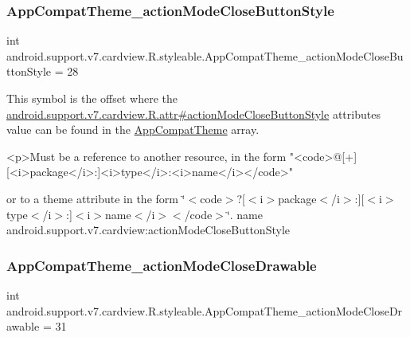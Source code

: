\subsubsection{\texorpdfstring{App\+Compat\+Theme\+\_\+action\+Mode\+Close\+Button\+Style}{AppCompatTheme\_actionModeCloseButtonStyle}}
{\footnotesize\ttfamily int android.\+support.\+v7.\+cardview.\+R.\+styleable.\+App\+Compat\+Theme\+\_\+action\+Mode\+Close\+Button\+Style = 28\hspace{0.3cm}{\ttfamily [static]}}

This symbol is the offset where the \hyperlink{classandroid_1_1support_1_1v7_1_1cardview_1_1R_1_1attr_ab744fe0cdbca0b2272aae43d708223b3}{android.\+support.\+v7.\+cardview.\+R.\+attr\#action\+Mode\+Close\+Button\+Style} attribute\textquotesingle{}s value can be found in the \hyperlink{classandroid_1_1support_1_1v7_1_1cardview_1_1R_1_1styleable_a52e6f69f954ecc2622d72c0b4d298938}{App\+Compat\+Theme} array.

\begin{DoxyVerb}      <p>Must be a reference to another resource, in the form "<code>@[+][<i>package</i>:]<i>type</i>:<i>name</i></code>"
\end{DoxyVerb}
 or to a theme attribute in the form \char`\"{}$<$code$>$?\mbox{[}$<$i$>$package$<$/i$>$\+:\mbox{]}\mbox{[}$<$i$>$type$<$/i$>$\+:\mbox{]}$<$i$>$name$<$/i$>$$<$/code$>$\char`\"{}.  name android.\+support.\+v7.\+cardview\+:action\+Mode\+Close\+Button\+Style \mbox{\label{classandroid_1_1support_1_1v7_1_1cardview_1_1R_1_1styleable_a9587a4674c7e1d0eabdd8e93770ef690}} 
\subsubsection{\texorpdfstring{App\+Compat\+Theme\+\_\+action\+Mode\+Close\+Drawable}{AppCompatTheme\_actionModeCloseDrawable}}
{\footnotesize\ttfamily int android.\+support.\+v7.\+cardview.\+R.\+styleable.\+App\+Compat\+Theme\+\_\+action\+Mode\+Close\+Drawable = 31\hspace{0.3cm}{\ttfamily [static]}}

